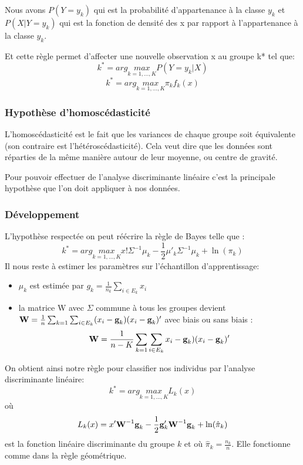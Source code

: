 	Nous avons $P(Y = y_k)$ qui est la probabilité d'appartenance à la classe $y_k$ et $P(X|Y = y_k)$ qui est la fonction de densité des x par rapport à l'appartenance à la classe $y_k$.
	
	Et cette règle permet d'affecter une nouvelle observation x au groupe k* tel que:
	\[
		k^* = arg \underset{k=1,...,K}{max} P(Y = y_k | X)
	\] 
	\[
		k^*= arg \underset{k=1,...,K}{max} \pi_kf_k(x)
	\]	

\subsubsection{Hypothèse d'homoscédasticité}
L'homoscédasticité est le fait que les variances de chaque groupe soit équivalente (son contraire est l'hétéroscédasticité). Cela veut dire que les données sont réparties de la même manière autour de leur moyenne, ou centre de gravité. 
		
		Pour pouvoir effectuer de l'analyse discriminante linéaire c'est la principale hypothèse que l'on doit appliquer à nos données.
	
\subsubsection{Développement}
\noindent L'hypothèse respectée on peut réécrire la règle de Bayes telle que :
\[
	k^* = arg \underset{k=1,...,K}{max}x!\Sigma^{-1}\mu_k - \frac{1}{2}\mu'_k\Sigma^{-1}\mu_k + \ln(\pi_k)
\]
Il nous reste à estimer les  paramètres sur l'échantillon d'apprentissage:
\begin{itemize}
	\item $\mu_k$ est estimée par $g_k = \frac{1}{n_k}\sum_{i\in E_k}x_i$
	\item la matrice W avec $\Sigma$ commune à tous les groupes devient $\text{\bf W} = \frac{1}{n} \sum_{k=1}\sum_{i\in E_k}(x_i - \text{\bf g}_k)(x_i - \text{\bf g}_k)'$ avec biais ou sans biais :$$\text{\bf W} = \frac{1}{n - K}\sum_{k=1}\sum_{i\in E_k}x_i - \text{\bf g}_k)(x_i - \text{\bf g}_k)'$$
\end{itemize}
On obtient ainsi notre règle pour classifier nos individus par l'analyse discriminante linéaire:
\[
	k^* = arg \underset{k=1,...,K}{max}L_k(x)
\]
où
\[
			L_k(x) = x'\text{\bf W}^{-1}\text{\bf g}_k - \frac{1}{2}\text{\bf g}'_k\text{\bf W}^{-1}\text{\bf g}_k + \ln(\hat{\pi}_k)
		\] est la fonction linéaire discriminante du groupe $k$ et où $\hat{\pi}_k = \frac{n_k}{n}$. Elle fonctionne comme dans la règle géométrique.
		
